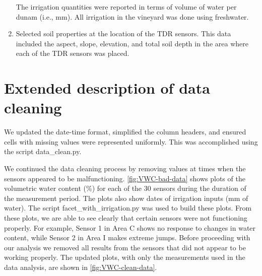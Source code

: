 \documentclass[12pt]{scrartcl}
\begin{document}
\begin{enumerate}
The irrigation quantities were reported in terms of volume of water per dunam (i.e., mm). All irrigation in the vineyard was done using freshwater.

 \item Selected soil properties at the location of the TDR sensors. This data included the aspect, slope, elevation, and total soil depth in the area where each of the TDR sensors was placed.
\end{enumerate}

\section{Extended description of data cleaning}\label{sec:Data-cleaning-appendix}
We updated the date-time format, simplified the column headers, and ensured cells with missing values were represented uniformly. This was accomplished using the script data\_clean.py.

We continued the data cleaning process by removing values at times when the sensors appeared to be malfunctioning. \autoref{fig:VWC-bad-data} shows plots of the volumetric water content (\%) for each of the 30 sensors during the duration of the measurement period. The plots also show dates of irrigation inputs (mm of water). The script facet\_with\_irrigation.py was used to build these plots. From these plots, we are able to see clearly that certain sensors were not functioning properly. For example, Sensor 1 in Area C shows no response to changes in water content, while Sensor 2 in Area I makes extreme jumps. Before proceeding with our analysis we removed all results from the sensors that did not appear to be working properly. The updated plots, with only the measurements used in the data analysis, are shown in \autoref{fig:VWC-clean-data}.
\end{document}
